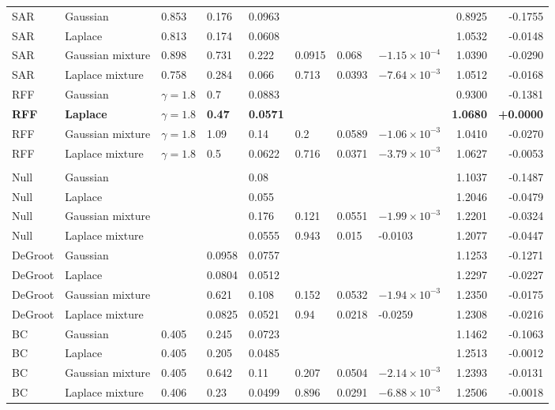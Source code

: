 \begin{longtable}{llllllllrr}
SAR & Gaussian & 0.853 & 0.176 & 0.0963 &  &  &  & 0.8925 & -0.1755 \\
SAR & Laplace & 0.813 & 0.174 & 0.0608 &  &  &  & 1.0532 & -0.0148 \\
SAR & Gaussian mixture & 0.898 & 0.731 & 0.222 & 0.0915 & 0.068 & $-1.15\times10^{-4}$ & 1.0390 & -0.0290 \\
SAR & Laplace mixture & 0.758 & 0.284 & 0.066 & 0.713 & 0.0393 & $-7.64\times10^{-3}$ & 1.0512 & -0.0168 \\
RFF & Gaussian & $\gamma=1.8$ & 0.7 & 0.0883 &  &  &  & 0.9300 & -0.1381 \\
\textbf{RFF} & \textbf{Laplace} & \textbf{$\gamma=1.8$} & \textbf{0.47} & \textbf{0.0571} &  &  &  & \textbf{1.0680} & \textbf{+0.0000} \\
RFF & Gaussian mixture & $\gamma=1.8$ & 1.09 & 0.14 & 0.2 & 0.0589 & $-1.06\times10^{-3}$ & 1.0410 & -0.0270 \\
RFF & Laplace mixture & $\gamma=1.8$ & 0.5 & 0.0622 & 0.716 & 0.0371 & $-3.79\times10^{-3}$ & 1.0627 & -0.0053 \\
\midrule
\multicolumn{10}{l}{\house{}} \\
Null & Gaussian &  &  & 0.08 &  &  &  & 1.1037 & -0.1487 \\
Null & Laplace &  &  & 0.055 &  &  &  & 1.2046 & -0.0479 \\
Null & Gaussian mixture &  &  & 0.176 & 0.121 & 0.0551 & $-1.99\times10^{-3}$ & 1.2201 & -0.0324 \\
Null & Laplace mixture &  &  & 0.0555 & 0.943 & 0.015 & -0.0103 & 1.2077 & -0.0447 \\
DeGroot & Gaussian &  & 0.0958 & 0.0757 &  &  &  & 1.1253 & -0.1271 \\
DeGroot & Laplace &  & 0.0804 & 0.0512 &  &  &  & 1.2297 & -0.0227 \\
DeGroot & Gaussian mixture &  & 0.621 & 0.108 & 0.152 & 0.0532 & $-1.94\times10^{-3}$ & 1.2350 & -0.0175 \\
DeGroot & Laplace mixture &  & 0.0825 & 0.0521 & 0.94 & 0.0218 & -0.0259 & 1.2308 & -0.0216 \\
BC & Gaussian & 0.405 & 0.245 & 0.0723 &  &  &  & 1.1462 & -0.1063 \\
BC & Laplace & 0.405 & 0.205 & 0.0485 &  &  &  & 1.2513 & -0.0012 \\
BC & Gaussian mixture & 0.405 & 0.642 & 0.11 & 0.207 & 0.0504 & $-2.14\times10^{-3}$ & 1.2393 & -0.0131 \\
BC & Laplace mixture & 0.406 & 0.23 & 0.0499 & 0.896 & 0.0291 & $-6.88\times10^{-3}$ & 1.2506 & -0.0018 \\

\end{longtable}
